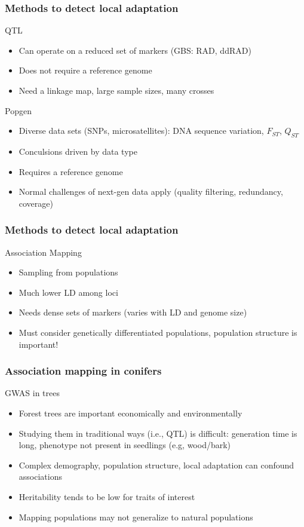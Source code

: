 \begin{frame}
\frametitle{Methods to detect local adaptation}
\begin{block}{QTL}
\begin{itemize}
\item{Can operate on a reduced set of markers (GBS: RAD, ddRAD)}
\item{Does not require a reference genome}
\item{Need a linkage map, large sample sizes, many crosses}
\end{itemize}
\end{block}

\begin{block}{Popgen}
\begin{itemize}
\item{Diverse data sets (SNPs, microsatellites): DNA sequence variation,
$F_{ST}$, $Q_{ST}$}
\item{Conculsions driven by data type}
\item{Requires a reference genome}
\item{Normal challenges of next-gen data apply (quality filtering, redundancy,
coverage)}
\end{itemize}
\end{block}
\end{frame}

\begin{frame}
\frametitle{Methods to detect local adaptation}
\begin{block}{Association Mapping}
\begin{itemize}
\item{Sampling from populations}
\item{Much lower LD among loci}
\item{Needs dense sets of markers (varies with LD and genome size)}
\item{Must consider genetically differentiated populations, population
structure is important!}
\end{itemize}
\end{block}
\end{frame}

\begin{frame}
\frametitle{Association mapping in conifers}
\begin{block}{GWAS in trees}
\begin{itemize}
\item{Forest trees are important economically and environmentally}
\item{Studying them in traditional ways (i.e., QTL) is difficult: generation
time is long, phenotype not present in seedlings (e.g, wood/bark)}
\item{Complex demography, population structure, local adaptation can confound 
associations}
\item{Heritability tends to be low for traits of interest}
\item{Mapping populations may not generalize to natural populations}
\end{itemize}
\end{block}
\tiny
\citet{Uchiyama:2013ci}
\end{frame}

